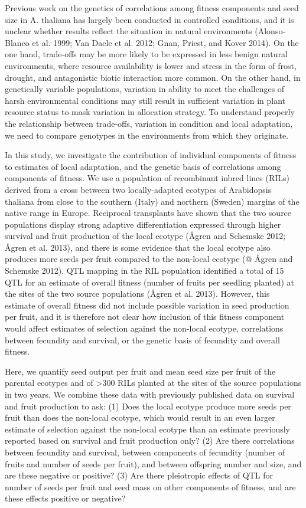 \documentclass[]{article}
\begin{document}
Previous work on the genetics of correlations among fitness components and seed size in A. thaliana has largely been conducted in controlled conditions, and it is unclear whether results reflect the situation in natural environments (Alonso-Blanco et al. 1999; Van Daele et al. 2012; Gnan, Priest, and Kover 2014). On the one hand, trade-offs may be more likely to be expressed in less benign natural environments, where resource availability is lower and stress in the form of frost, drought, and antagonistic biotic interaction more common. On the other hand, in genetically variable populations, variation in ability to meet the challenges of harsh environmental conditions may still result in sufficient variation in plant resource status to mask variation in allocation strategy. To understand properly the relationship between trade-offs, variation in condition and local adaptation, we need to compare genotypes in the environments from which they originate.

In this study, we investigate the contribution of individual components of fitness to estimates of local adaptation, and the genetic basis of correlations among components of fitness. We use a population of recombinant inbred lines (RILs) derived from a cross between two locally-adapted ecotypes of Arabidopsis thaliana from close to the southern (Italy) and northern (Sweden) margins of the native range in Europe. Reciprocal transplants have shown that the two source populations display strong adaptive differentiation expressed through higher survival and fruit production of the local ecotype (Ågren and Schemske 2012; Ågren et al. 2013), and there is some evidence that the local ecotype also produces more seeds per fruit compared to the non-local ecotype (@ Ågren and Schemske 2012). QTL mapping in the RIL population identified a total of 15 QTL for an estimate of overall fitness (number of fruits per seedling planted) at the sites of the two source populations (Ågren et al. 2013). However, this estimate of overall fitness did not include possible variation in seed production per fruit, and it is therefore not clear how inclusion of this fitness component would affect estimates of selection against the non-local ecotype, correlations between fecundity and survival, or the genetic basis of fecundity and overall fitness.

Here, we quantify seed output per fruit and mean seed size per fruit of the parental ecotypes and of \textgreater{}300 RILs planted at the sites of the source populations in two years. We combine these data with previously published data on survival and fruit production to ask: (1) Does the local ecotype produce more seeds per fruit than does the non-local ecotype, which would result in an even larger estimate of selection against the non-local ecotype than an estimate previously reported based on survival and fruit production only? (2) Are there correlations between fecundity and survival, between components of fecundity (number of fruits and number of seeds per fruit), and between offspring number and size, and are these negative or positive? (3) Are there pleiotropic effects of QTL for number of seeds per fruit and seed mass on other components of fitness, and are these effects positive or negative?
\end{document}
